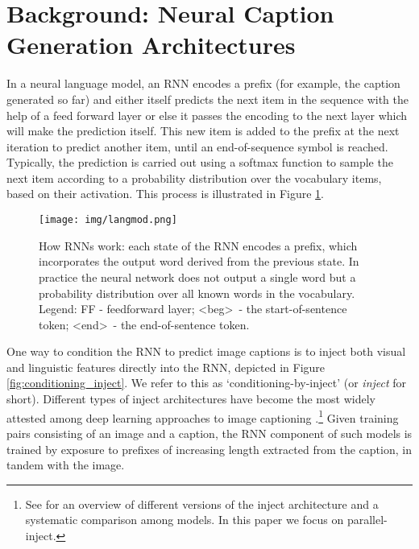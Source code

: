 \documentclass[11pt,letterpaper]{article}
\begin{document}
\section{Background: Neural Caption Generation Architectures}\label{sec:background}

In a neural language model, an RNN encodes a prefix (for example, the caption generated so far) and either itself predicts the next item in the sequence with the help of a feed forward layer or else it passes the encoding to the next layer which will make the prediction itself. This new item is added to the prefix at the next iteration to predict another item, until an end-of-sequence symbol is reached. Typically, the prediction is carried out using a softmax function to sample the next item according to a probability distribution over the vocabulary items, based on their activation. This process is illustrated in Figure \ref{fig:rnn-cont}.

\begin{figure}[t]
	\centering
	  \texttt{[image: img/langmod.png]}	
      \caption{
          \label{fig:rnn-cont}
          How RNNs work: each state of the RNN encodes a prefix, which incorporates the output word derived from the previous state. In practice the neural network does not output a single word but a probability distribution over all known words in the vocabulary. Legend: FF - feedforward layer; \textless beg\textgreater\ - the start-of-sentence token; \textless end\textgreater\ - the end-of-sentence token. 
      }
\end{figure}

One way to condition the RNN to predict image captions is to inject both visual and linguistic features directly into the RNN, depicted in Figure \ref{fig:conditioning_inject}. We refer to this as `conditioning-by-inject' (or {\em inject} for short). Different types of inject architectures have become the most widely attested among deep learning approaches to image captioning \cite{Chen2015,Donahue2015,Hessel2015,Karpathy2015,Liu2016,Yang2016,Zhou2016}.\footnote{See  for an overview of different versions of the inject architecture and a systematic comparison among models. In this paper we focus on parallel-inject.} Given training pairs consisting of an image and a caption, the RNN component of such models is trained by exposure to prefixes of increasing length extracted from the caption, in tandem with the image.
\end{document}
